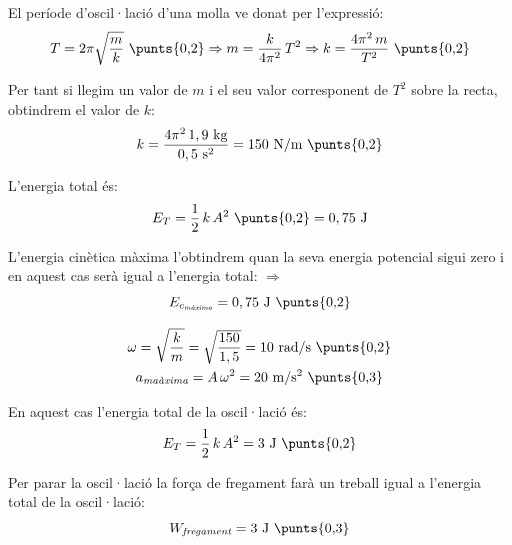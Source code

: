 \begin{solapartat}
El període d'oscil·lació d'una molla ve donat per l'expressió:
\[ T = 2\pi\sqrt{\frac{m}{k}}\ \text{\punts{0,2}} \Rightarrow m = \frac{k}{4\pi^2}\,T^2 \Rightarrow k = \frac{4\pi^2\,m}{T^2}\ \text{\punts{0,2}} \]

Per tant si llegim un valor de $m$ i el seu valor corresponent de $T^2$ sobre la recta, obtindrem el valor de $k$:
\[ k = \frac{4\pi^2\,1,9\ \mathrm{kg}}{0,5\ \mathrm{s^2}} = 150\ \mathrm{N/m}\ \text{\punts{0,2}} \]

L'energia total és:
\[ E_T = \frac{1}{2}\,k\,A^2\ \text{\punts{0,2}} = 0,75\ \mathrm{J} \]

L'energia cinètica màxima l'obtindrem quan la seva energia potencial sigui zero i en aquest cas serà igual a l'energia total: $\Rightarrow$
\[ E_{c_\textit{màxima}} = 0,75\ \mathrm{J}\ \text{\punts{0,2}} \]
\end{solapartat}

\begin{solapartat}
\begin{gather*}
\omega = \sqrt{\frac{k}{m}} = \sqrt{\frac{150}{1,5}} = 10\ \mathrm{rad/s}\ \text{\punts{0,2}}\\
a_\textit{maàxima} = A\,\omega^2 = 20\ \mathrm{m/s^2}\ \text{\punts{0,3}} %
\end{gather*}

En aquest cas l'energia total de la oscil·lació és:
\[ E_T = \frac{1}{2}\,k\,A^2 = 3\ \mathrm{J}\ \text{\punts{0,2}} \]

Per parar la oscil·lació la força de fregament farà un treball igual a l'energia total de la oscil·lació:
\[ W_\textit{fregament} = 3\ \mathrm{J}\ \text{\punts{0,3}} \]
\end{solapartat}
